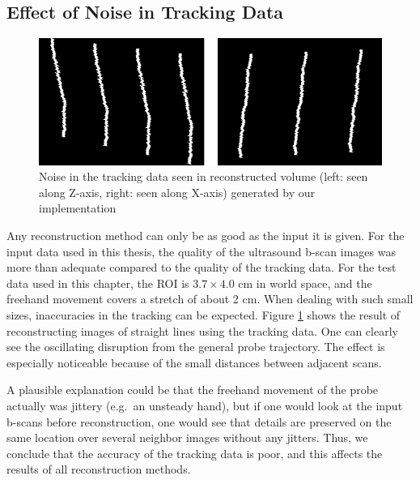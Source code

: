 
\subsection{Effect of Noise in Tracking Data}

	\begin{figure}[h]
	\centering
	\includegraphics[width=\textwidth]{graphics/tracking_noise.png}
	\caption[Noise in the tracking data]{Noise in the tracking data seen in reconstructed volume (left: seen along Z-axis, right: seen along X-axis) generated by our implementation}
	\label{fig:tracking_noise}
	\end{figure}

	Any reconstruction method can only be as good as the input it is given. For the input data used in this thesis, the quality of the ultrasound b-scan images was more than adequate compared to the quality of the tracking data. For the test data used in this chapter, the ROI is $3.7 \times 4.0$ cm in world space, and the freehand movement covers a stretch of about 2 cm. When dealing with such small sizes, inaccuracies in the tracking can be expected. Figure \ref{fig:tracking_noise} shows the result of reconstructing images of straight lines using the tracking data. One can clearly see the oscillating disruption from the general probe trajectory. The effect is especially noticeable because of the small distances between adjacent scans.
	
	A plausible explanation could be that the freehand movement of the probe actually was jittery (e.g.\ an unsteady hand), but if one would look at the input b-scans before reconstruction, one would see that details are preserved on the same location over several neighbor images without any jitters. Thus, we conclude that the accuracy of the tracking data is poor, and this affects the results of all reconstruction methods.

